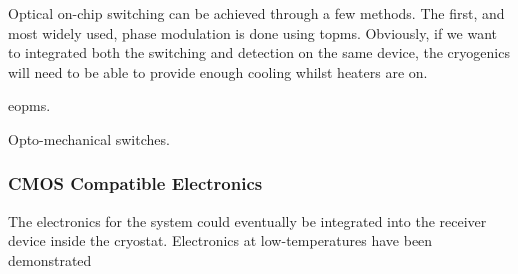 Optical on-chip switching can be achieved through a few methods. The first, and most widely used, phase modulation is done using \acp{topm}. Obviously, if we want to integrated both the switching and detection on the same device, the cryogenics will need to be able to provide enough cooling whilst heaters are on.

\acp{eopm}.

Opto-mechanical switches.

\subsubsection*{CMOS Compatible Electronics}

The electronics for the system could eventually be integrated into the receiver device inside the cryostat. Electronics at low-temperatures have been demonstrated \cite{bardin2019}


